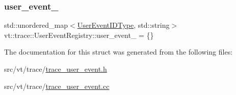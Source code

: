 \mbox{\label{structvt_1_1trace_1_1_user_event_registry_a5756ec4a07f4624f2da1538afe1e553d}} 
\subsubsection{\texorpdfstring{user\+\_\+event\+\_\+}{user\_event\_}}
{\footnotesize\ttfamily std\+::unordered\+\_\+map$<$\hyperlink{namespacevt_1_1trace_a5908920d051c144c89f17c69ed262350}{User\+Event\+I\+D\+Type}, std\+::string$>$ vt\+::trace\+::\+User\+Event\+Registry\+::user\+\_\+event\+\_\+ = \{\}\hspace{0.3cm}{\ttfamily [private]}}



The documentation for this struct was generated from the following files\+:\begin{DoxyCompactItemize}
\item 
src/vt/trace/\hyperlink{trace__user__event_8h}{trace\+\_\+user\+\_\+event.\+h}\item 
src/vt/trace/\hyperlink{trace__user__event_8cc}{trace\+\_\+user\+\_\+event.\+cc}\end{DoxyCompactItemize}
